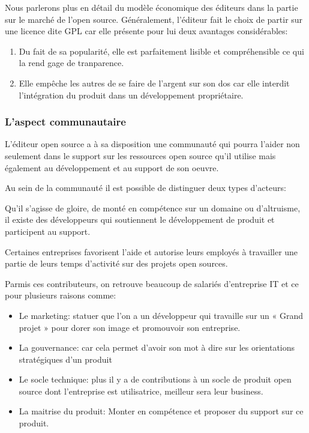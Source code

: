 				Nous parlerons plus en détail du modèle économique des éditeurs dans la partie sur le marché de l'open source.
				Généralement, l'éditeur fait le choix de partir sur une licence dite GPL car elle présente pour lui deux avantages considérables:

				\begin{enumerate}[font=\color{burntorange}]
		 			\item Du fait de sa popularité, elle est parfaitement lisible et compréhensible ce qui la rend gage de tranparence.
		 			\item Elle empêche les autres de se faire de l'argent sur son dos car elle interdit l'intégration du produit dans un développement propriétaire.
				\end{enumerate}

			\subsubsection{L'aspect communautaire}

				L'éditeur open source a à sa disposition une communauté qui pourra l'aider non seulement dans le support sur les ressources open source qu'il utilise mais également au développement et au support de son oeuvre.

				Au sein de la communauté il est possible de distinguer deux types d'acteurs:

				\begin{description}[font=\color{burntorange}]
					\item[les développeurs indépendants: ] Qu'il s'agisse de gloire, de monté en compétence sur un domaine ou d'altruisme, il existe des développeurs qui soutiennent le développement de produit et participent au support.
					\item[Les contributeurs et entreprises contributrices: ] Certaines entreprises favorisent l'aide et autorise leurs employés à travailler une partie de leurs temps d'activité sur des projets open sources.
				\end{description}

				Parmis ces contributeurs, on retrouve beaucoup de salariés d'entreprise IT et ce pour plusieurs raisons comme:

				\begin{itemize}[label=\textbullet, font=\LARGE \color{burntorange}]
					\item Le marketing: statuer que l'on a un développeur qui travaille sur un « Grand projet » pour dorer son image et promouvoir son entreprise.
					\item La gouvernance: car cela permet d'avoir son mot à dire sur les orientations stratégiques d'un produit
					\item Le socle technique: plus il y a de contributions à un socle de produit open source dont l'entreprise est utilisatrice, meilleur sera leur business.
					\item La maitrise du produit: Monter en compétence et proposer du support sur ce produit.
				\end{itemize}

